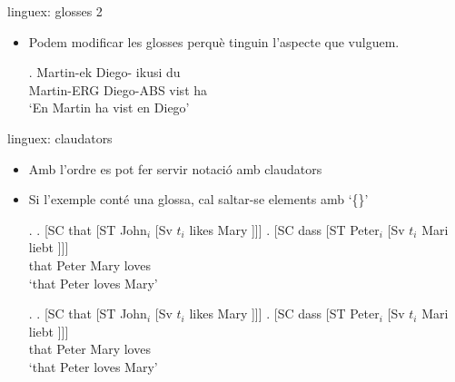 \begin{frame}[fragile]{linguex: glosses 2}
\begin{itemize}
\item Podem modificar les glosses perquè tinguin l'aspecte que vulguem.
\begin{exampletwouptiny}
\renewcommand{\eachwordone}{\itshape}
\renewcommand{\eachwordtwo}{\tiny}

\exg. 
Martin-ek Diego-\zero{} ikusi du \\
Martin-ERG Diego-ABS vist ha \\
\glt `En Martin ha vist en Diego'


\end{exampletwouptiny}
\end{itemize}

\end{frame}

\begin{frame}[fragile]{linguex: claudators}
\begin{itemize}
\item Amb l'ordre  es pot fer servir notació amb claudators
\item Si l'exemple conté una glossa, cal saltar-se elements amb `\{\}'
\begin{MyMinted}
\exi.
\a.  [SC that [ST John$_i$  [Sv $t_i$ likes Mary ]]]
\bg. [SC dass [ST Peter$_i$ [Sv $t_i$ Mari liebt ]]] \\
{} that {} Peter {} {} Mary loves \\
\glt `that Peter loves Mary'
\end{MyMinted}
\exi.
\a.  [SC that [ST John$_i$  [Sv $t_i$ likes Mary ]]]
\bg. [SC dass [ST Peter$_i$ [Sv $t_i$ Mari liebt ]]] \\
{} that {} Peter {} {} Mary loves \\
\glt `that Peter loves Mary'

\end{itemize}

\end{frame}

